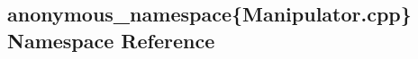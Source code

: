 \hypertarget{namespaceanonymous__namespace_02Manipulator_8cpp_03}{}\subsection{anonymous\+\_\+namespace\{Manipulator.\+cpp\} Namespace Reference}
\label{namespaceanonymous__namespace_02Manipulator_8cpp_03}
